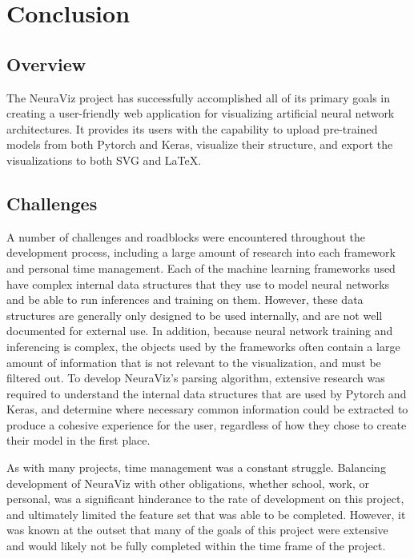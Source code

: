 \section{Conclusion}																	
\label{sec:Conclusion}

\subsection{Overview} 
The NeuraViz project has successfully accomplished all of its primary goals in creating a user-friendly web application for visualizing artificial neural network architectures. It provides its users with the capability to upload pre-trained models from both Pytorch and Keras, visualize their structure, and export the visualizations to both SVG and \LaTeX{}.

\subsection{Challenges}
A number of challenges and roadblocks were encountered throughout the development process, including a large amount of research into each framework and personal time management. Each of the machine learning frameworks used have complex internal data structures that they use to model neural networks and be able to run inferences and training on them. However, these data structures are generally only designed to be used internally, and are not well documented for external use. In addition, because neural network training and inferencing is complex, the objects used by the frameworks often contain a large amount of information that is not relevant to the visualization, and must be filtered out. To develop NeuraViz's parsing algorithm, extensive research was required to understand the internal data structures that are used by Pytorch and Keras, and determine where necessary common information could be extracted to produce a cohesive experience for the user, regardless of how they chose to create their model in the first place.

As with many projects, time management was a constant struggle. Balancing development of NeuraViz with other obligations, whether school, work, or personal, was a significant hinderance to the rate of development on this project, and ultimately limited the feature set that was able to be completed. However, it was known at the outset that many of the goals of this project were extensive and would likely not be fully completed within the time frame of the project.


